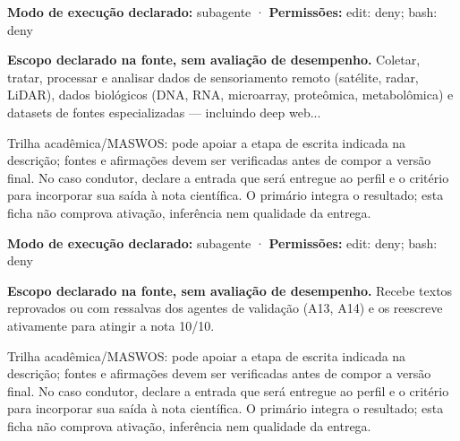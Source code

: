 \begin{arquitetura}
\textbf{Modo de execução declarado:} subagente · \textbf{Permissões:} edit: deny; bash: deny
\end{arquitetura}


\begin{descricao}
\textbf{Escopo declarado na fonte, sem avaliação de desempenho.}
Coletar, tratar, processar e analisar dados de sensoriamento remoto (satélite, radar, LiDAR), dados biológicos (DNA, RNA, microarray, proteômica, metabolômica) e datasets de fontes especializadas — incluindo deep web...
\end{descricao}

\begin{funcao}
Trilha acadêmica/MASWOS: pode apoiar a etapa de escrita indicada na descrição; fontes e afirmações devem ser verificadas antes de compor a versão final. No caso condutor, declare a entrada que será entregue ao perfil e o critério para incorporar sua saída à nota científica. O primário integra o resultado; esta ficha não comprova ativação, inferência nem qualidade da entrega.
\end{funcao}

\begin{arquitetura}
\textbf{Modo de execução declarado:} subagente · \textbf{Permissões:} edit: deny; bash: deny
\end{arquitetura}


\begin{descricao}
\textbf{Escopo declarado na fonte, sem avaliação de desempenho.}
Recebe textos reprovados ou com ressalvas dos agentes de validação (A13, A14) e os reescreve ativamente para atingir a nota 10/10.
\end{descricao}

\begin{funcao}
Trilha acadêmica/MASWOS: pode apoiar a etapa de escrita indicada na descrição; fontes e afirmações devem ser verificadas antes de compor a versão final. No caso condutor, declare a entrada que será entregue ao perfil e o critério para incorporar sua saída à nota científica. O primário integra o resultado; esta ficha não comprova ativação, inferência nem qualidade da entrega.
\end{funcao}

